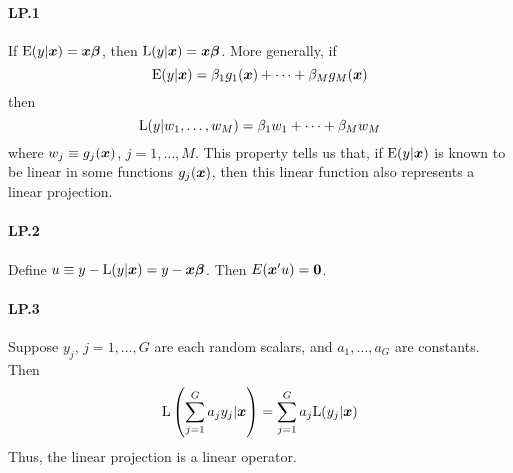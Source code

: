 \documentclass[11pt, oneside, a4paper, article]{article}
\numberwithin{equation}{section}
\begin{document}
\paragraph{LP.1}
If $\text{E}(y | \boldsymbol{x}) = \boldsymbol{x} \boldsymbol{\beta}$, then $\text{L}(y | \boldsymbol{x}) = \boldsymbol{x} \boldsymbol{\beta}$.
More generally, if 
\begin{equation*}
\text{E}( y | \boldsymbol{x}) = \beta_{1} g_{1}(\boldsymbol{x}) + \dots + \beta_{M} g_{M} (\boldsymbol{x})
\end{equation*}
then
\begin{equation*}
	\text{L}(y | w_{1}, \dots, w_{M}) = \beta_{1} w_{1} + \dots + \beta_{M} w_{M}
\end{equation*}
where $w_{j} \equiv g_{j}(\boldsymbol{x})$, $j=1, \dots, M$.
This property tells us that, if $\text{E}(y | \boldsymbol{x})$ is known to be linear in some functions $g_{j}(\boldsymbol{x})$, then this linear function also represents a linear projection.

\paragraph{LP.2}
Define $u \equiv y - \text{L}(y | \boldsymbol{x}) = y - \boldsymbol{x} \boldsymbol{\beta}$. 
Then $E(\boldsymbol{x}'u) = \boldsymbol{0}$.

\paragraph{LP.3}
Suppose $y_{j}$, $j = 1, \dots, G$ are each random scalars, and 
$a_{1}, \dots, a_{G}$ are constants.
Then
\begin{equation*}
	\text{L}\left(  \sum_{j=1}^{G} a_{j} y_{j} | \boldsymbol{x} \right)
=
	\sum_{j=1}^{G} a_{j} \text{L}( y_{j} | \boldsymbol{x} )
\end{equation*}
Thus, the linear projection is a linear operator.

\end{document}
